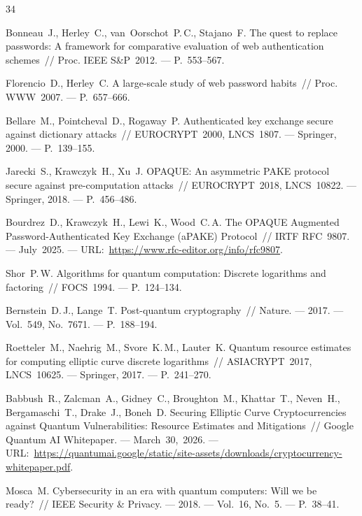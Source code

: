 \documentclass{llncs}
\begin{document}
\begin{thebibliography}{34}

Bonneau~J., Herley~C., van~Oorschot~P.\,C., Stajano~F.
The quest to replace passwords: A framework for comparative evaluation of web authentication schemes~//
Proc. IEEE S\&P~2012. --- P.~553--567.

Florencio~D., Herley~C.
A large-scale study of web password habits~//
Proc. WWW~2007. --- P.~657--666.

Bellare~M., Pointcheval~D., Rogaway~P.
Authenticated key exchange secure against dictionary attacks~//
EUROCRYPT~2000, LNCS~1807. --- Springer, 2000. --- P.~139--155.

Jarecki~S., Krawczyk~H., Xu~J.
OPAQUE: An asymmetric PAKE protocol secure against pre-computation attacks~//
EUROCRYPT~2018, LNCS~10822. --- Springer, 2018. --- P.~456--486.

Bourdrez~D., Krawczyk~H., Lewi~K., Wood~C.\,A.
The OPAQUE Augmented Password-Authenticated Key Exchange (aPAKE) Protocol~//
IRTF RFC~9807. --- July~2025. ---
URL:~\url{https://www.rfc-editor.org/info/rfc9807}.

Shor~P.\,W.
Algorithms for quantum computation: Discrete logarithms and factoring~//
FOCS~1994. --- P.~124--134.

Bernstein~D.\,J., Lange~T.
Post-quantum cryptography~//
Nature. --- 2017. --- Vol.~549, No.~7671. --- P.~188--194.

Roetteler~M., Naehrig~M., Svore~K.\,M., Lauter~K.
Quantum resource estimates for computing elliptic curve discrete logarithms~//
ASIACRYPT~2017, LNCS~10625. --- Springer, 2017. --- P.~241--270.

Babbush~R., Zalcman~A., Gidney~C., Broughton~M., Khattar~T.,
Neven~H., Bergamaschi~T., Drake~J., Boneh~D.
Securing Elliptic Curve Cryptocurrencies against Quantum Vulnerabilities:
Resource Estimates and Mitigations~//
Google Quantum AI Whitepaper. --- March~30,~2026. ---
URL:~\url{https://quantumai.google/static/site-assets/downloads/cryptocurrency-whitepaper.pdf}.

Mosca~M.
Cybersecurity in an era with quantum computers: Will we be ready?~//
IEEE Security \& Privacy. --- 2018. --- Vol.~16, No.~5. --- P.~38--41.


\end{thebibliography}
\end{document}
